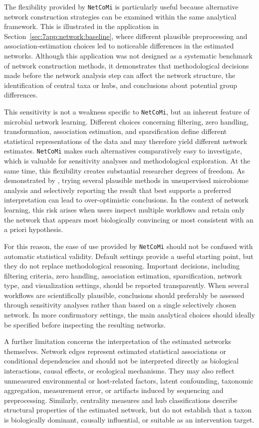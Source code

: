 The flexibility provided by \texttt{NetCoMi} is particularly useful because alternative network construction strategies can be examined within the same analytical framework. This is illustrated in the application in Section~\ref{sec:7app:network:baseline}, where different plausible preprocessing and association-estimation choices led to noticeable differences in the estimated networks. Although this application was not designed as a systematic benchmark of network construction methods, it demonstrates that methodological decisions made before the network analysis step can affect the network structure, the identification of central taxa or hubs, and conclusions about potential group differences.

This sensitivity is not a weakness specific to \texttt{NetCoMi}, but an inherent feature of microbial network learning. Different choices concerning filtering, zero handling, transformation, association estimation, and sparsification define different statistical representations of the data and may therefore yield different network estimates. \texttt{NetCoMi} makes such alternatives comparatively easy to investigate, which is valuable for sensitivity analyses and methodological exploration. At the same time, this flexibility creates substantial researcher degrees of freedom. As demonstrated by \citet{ullmann2023overoptimism}, trying several plausible methods in unsupervised microbiome analysis and selectively reporting the result that best supports a preferred interpretation can lead to over-optimistic conclusions. In the context of network learning, this risk arises when users inspect multiple workflows and retain only the network that appears most biologically convincing or most consistent with an a priori hypothesis.

For this reason, the ease of use provided by \texttt{NetCoMi} should not be confused with automatic statistical validity. Default settings provide a useful starting point, but they do not replace methodological reasoning. Important decisions, including filtering criteria, zero handling, association estimation, sparsification, network type, and visualization settings, should be reported transparently. When several workflows are scientifically plausible, conclusions should preferably be assessed through sensitivity analyses rather than based on a single selectively chosen network. In more confirmatory settings, the main analytical choices should ideally be specified before inspecting the resulting networks.

A further limitation concerns the interpretation of the estimated networks themselves. Network edges represent estimated statistical associations or conditional dependencies and should not be interpreted directly as biological interactions, causal effects, or ecological mechanisms. They may also reflect unmeasured environmental or host-related factors, latent confounding, taxonomic aggregation, measurement error, or artifacts induced by sequencing and preprocessing. Similarly, centrality measures and hub classifications describe structural properties of the estimated network, but do not establish that a taxon is biologically dominant, causally influential, or suitable as an intervention target.

